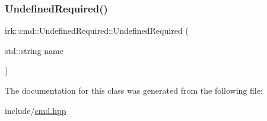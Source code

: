 \subsubsection{\texorpdfstring{Undefined\+Required()}{UndefinedRequired()}}
{\footnotesize\ttfamily irk\+::cmd\+::\+Undefined\+Required\+::\+Undefined\+Required (\begin{DoxyParamCaption}\item[{std\+::string}]{name }\end{DoxyParamCaption})\hspace{0.3cm}{\ttfamily [inline]}}



The documentation for this class was generated from the following file\+:\begin{DoxyCompactItemize}
\item 
include/\mbox{\hyperlink{cmd_8hpp}{cmd.\+hpp}}\end{DoxyCompactItemize}
